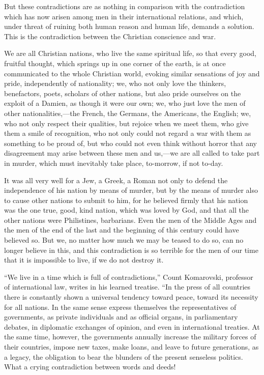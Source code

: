 \documentclass{book}
\begin{document}
But these contradictions are as nothing in comparison with the contradiction which has now arisen among men in their international relations, and which, under threat of ruining both human reason and human life, demands a solution. This is the contradiction between the Christian conscience and war.

We are all Christian nations, who live the same spiritual life, so that every good, fruitful thought, which springs up in one corner of the earth, is at once communicated to the whole Christian world, evoking similar sensations of joy and pride, independently of nationality; we, who not only love the thinkers, benefactors, poets, scholars of other nations, but also pride ourselves on the exploit of a Damien, as though it were our own; we, who just love the men of other nationalities,—the French, the Germans, the Americans, the English; we, who not only respect their qualities, but rejoice when we meet them, who give them a smile of recognition, who not only could not regard a war with them as something to be proud of, but who could not even think without horror that any disagreement may arise between these men and us,—we are all called to take part in murder, which must inevitably take place, to-morrow, if not to-day.

It was all very well for a Jew, a Greek, a Roman not only to defend the independence of his nation by means of murder, but by the means of murder also to cause other nations to submit to him, for he believed firmly that his nation was the one true, good, kind nation, which was loved by God, and that all the other nations were Philistines, barbarians. Even the men of the Middle Ages and the men of the end of the last and the beginning of this century could have believed so. But we, no matter how much we may be teased to do so, can no longer believe in this, and this contradiction is so terrible for the men of our time that it is impossible to live, if we do not destroy it.

“We live in a time which is full of contradictions,” Count Komarovski, professor of international law, writes in his learned treatise. “In the press of all countries there is constantly shown a universal tendency toward peace, toward its necessity for all nations. In the same sense express themselves the representatives of governments, as private individuals and as official organs, in parliamentary debates, in diplomatic exchanges of opinion, and even in international treaties. At the same time, however, the governments annually increase the military forces of their countries, impose new taxes, make loans, and leave to future generations, as a legacy, the obligation to bear the blunders of the present senseless politics. What a crying contradiction between words and deeds!
\end{document}
